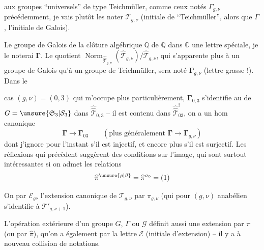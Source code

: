  aux groupes ``universels'' de type Teichmüller, comme ceux notés $\Gamma_{g,\nu}$ précédemment, je vais plutôt les noter  $\mathcal T_{g,\nu}$ (initiale de ``Teichmüller'', alors que $\Gamma$,   l'initiale de Galois).

Le groupe de Galois  de la clôture algébrique $\overline{\mathbb Q}$ de $\mathbb Q$ dans $\mathbb C$   une lettre spéciale, je le noterai $\boldsymbol{\Gamma}$. Le quotient  $\operatorname{Norm}_{\widehat{\widehat{\mathcal T}}_{g,\nu}}(\widehat{\mathcal T}_{g,\nu})/\widehat{\mathcal T}_{g,\nu}$, qui s'apparente plus à un groupe de Galois qu'à un groupe de Teichmüller, sera noté $\boldsymbol{\Gamma}_{g,\nu}$ (lettre grasse !). Dans le



cas $(g,\nu)=(0,3)$ qui m'occupe plus particulièrement, $\boldsymbol{\Gamma}_{0,3}$ s'identifie au   de $G=\unsure{\mathfrak S_3|\mathcal S_3}$  dans $\widehat{\widehat{\mathcal T}}_{0,3}$ -- il est contenu dans $\widehat{\widehat{\mathcal T}}_{03}^{!}$, 
on a un hom canonique
\[
\boldsymbol{\Gamma}\longrightarrow\boldsymbol{\Gamma}_{03}
\qquad (\text{plus généralement }\boldsymbol{\Gamma}\longrightarrow\boldsymbol{\Gamma}_{g,\nu})
\]
dont j'ignore pour l'instant s'il est injectif, et encore plus s'il est surjectif. Les réflexions qui précèdent suggèrent des conditions sur l'image, qui sont surtout intéressantes si on admet les relations
\[
\widehat{\pi}^{\unsure{\rho|\beta}}=\widehat{\pi}^{\sigma_0}=(1)
\]

On   par $\mathcal E_{g\nu}$ l'extension canonique de $\mathcal T_{g,\nu}$ par $\pi_{g,\nu}$ (qui pour $(g,\nu)$ anabélien s'identifie à $\mathcal T'_{g,\nu+1}$).

L'opération extérieure d'un groupe $G$, $\Gamma$ ou $\mathcal G$ définit aussi une extension par $\pi$ (ou par $\widehat{\pi}$), qu'on a également  par la lettre $\mathcal E$ (initiale d'extension) -- il y a à nouveau collision de notations.


